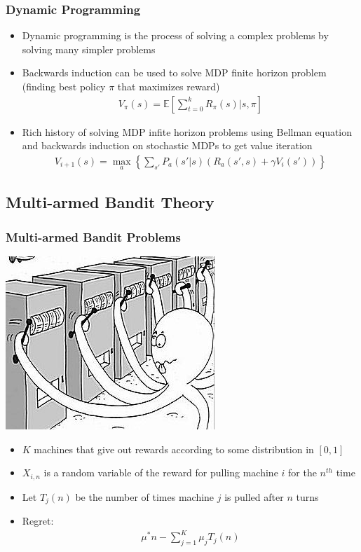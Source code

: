 \documentclass{beamer}
\begin{document}


\begin{frame}
  \frametitle{Dynamic Programming}

  \begin{itemize}
    \item Dynamic programming is the process of solving a complex problems by solving many simpler problems
    \item Backwards induction can be used to solve MDP finite horizon problem (finding best policy $\pi$ that maximizes reward)
      \begin{gather*}
        V_\pi(s) = \mathbb{E}[\sum_{t=0}^k R_\pi(s) | s, \pi]
      \end{gather*}
    \item Rich history of solving MDP infite horizon problems using Bellman equation and backwards induction on stochastic MDPs to get value iteration
      \begin{gather*}
        V_{i+1}(s) = \max_a \left\{ \sum_{s'} P_a(s' | s)(R_a(s',s)+\gamma V_i(s'))  \right\}
      \end{gather*}
  \end{itemize}
\end{frame}


\subsection{Multi-armed Bandit Theory}

\begin{frame}
  \frametitle{Multi-armed Bandit Problems}

  \begin{center}
    \includegraphics[width=0.3\linewidth]{./images/bandit.png}
  \end{center}

  \begin{itemize}
    \item $K$ machines that give out rewards according to some distribution in $[0,1]$
    \item $X_{i,n}$ is a random variable of the reward for pulling machine $i$ for the $n^{th}$ time
    \item Let $T_j(n)$ be the number of times machine $j$ is pulled after $n$ turns
    \item Regret:
      \begin{gather*}
        \mu^* n - \sum_{j=1}^{K} \mu_j T_j(n)
      \end{gather*}
  \end{itemize}
\end{frame}
\end{document}
